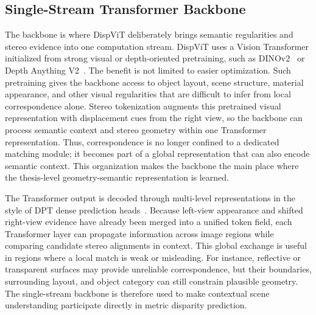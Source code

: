 \subsection{Single-Stream Transformer Backbone}
The backbone is where DispViT deliberately brings semantic regularities and stereo evidence into one computation stream.
DispViT uses a Vision Transformer initialized from strong visual or depth-oriented pretraining, such as DINOv2~\cite{oquab2023dinov2} or Depth Anything V2~\cite{yang2024depth}.
The benefit is not limited to easier optimization.
Such pretraining gives the backbone access to object layout, scene structure, material appearance, and other visual regularities that are difficult to infer from local correspondence alone.
Stereo tokenization augments this pretrained visual representation with displacement cues from the right view, so the backbone can process semantic context and stereo geometry within one Transformer representation.
Thus, correspondence is no longer confined to a dedicated matching module; it becomes part of a global representation that can also encode semantic context.
This organization makes the backbone the main place where the thesis-level geometry-semantic representation is learned.

The Transformer output is decoded through multi-level representations in the style of DPT dense prediction heads~\cite{ranftl2021vision}.
Because left-view appearance and shifted right-view evidence have already been merged into a unified token field, each Transformer layer can propagate information across image regions while comparing candidate stereo alignments in context.
This global exchange is useful in regions where a local match is weak or misleading.
For instance, reflective or transparent surfaces may provide unreliable correspondence, but their boundaries, surrounding layout, and object category can still constrain plausible geometry.
The single-stream backbone is therefore used to make contextual scene understanding participate directly in metric disparity prediction.

